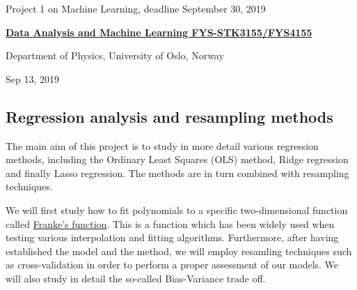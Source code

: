 \documentclass[%
oneside,                 %
final,                   %
10pt]{article}
\begin{document}

\newcommand{\exercisesection}[1]{\subsection*{#1}}






\thispagestyle{empty}

\begin{center}
{\LARGE\bf
\begin{spacing}{1.25}
Project 1 on Machine Learning, deadline September 30, 2019
\end{spacing}
}
\end{center}


\begin{center}
{\bf \href{{http://www.uio.no/studier/emner/matnat/fys/FYS3155/index-eng.html}}{Data Analysis and Machine Learning FYS-STK3155/FYS4155}}
\end{center}

    \begin{center}
\centerline{{\small Department of Physics, University of Oslo, Norway}}
\end{center}
    

\begin{center}
Sep 13, 2019
\end{center}

\vspace{1cm}


\subsection{Regression analysis and resampling methods}

The main aim of this project is to study in more detail various
regression methods, including the Ordinary Least Squares (OLS) method,
Ridge regression and finally Lasso regression.
The methods are in turn combined with resampling techniques.

We will first study how to fit polynomials to a specific
two-dimensional function called \href{{http://www.dtic.mil/dtic/tr/fulltext/u2/a081688.pdf}}{Franke's
function}.  This
is a function which has been widely used when testing various
interpolation and fitting algorithms. Furthermore, after having
established the model and the method, we will employ resamling
techniques such as cross-validation in order to perform a
proper assessment of our models. We will also study in detail the
so-called Bias-Variance trade off.
\end{document}
